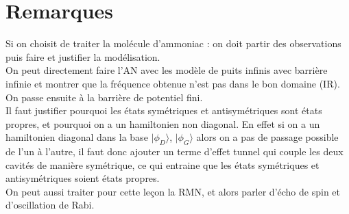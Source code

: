 \documentclass[12pt,prb,aps,epsf]{report}
\begin{document}
\section*{Remarques}
Si on choisit de traiter la molécule d'ammoniac : on doit partir des observations puis faire et justifier la modélisation.\\ 
On peut directement faire l'AN avec les modèle de puits infinis avec barrière infinie et montrer que la fréquence obtenue n'est pas dans le bon domaine (IR). On passe ensuite à la barrière de potentiel fini.\\ 
Il faut justifier pourquoi les états symétriques et antisymétriques sont états propres, et pourquoi on a un hamiltonien non diagonal. En effet si on a un hamiltonien diagonal dans la base $|\phi_D\rangle$, $|\phi_G\rangle$ alors on a pas de passage possible de l'un à l'autre, il faut donc ajouter un terme d'effet tunnel qui couple les deux cavités de manière symétrique, ce qui entraine que les états symétriques et antisymétriques soient états propres.\\
On peut aussi traiter pour cette leçon la RMN, et alors parler d'écho de spin et d'oscillation de Rabi.
\end{document}
